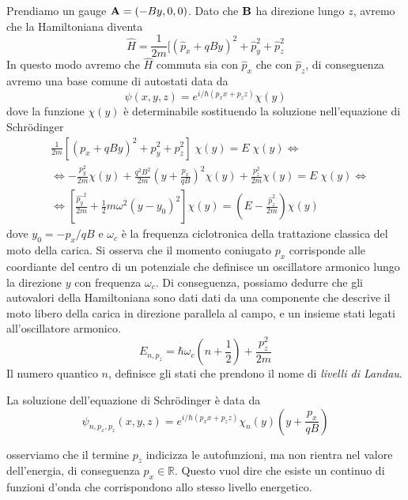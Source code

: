 Prendiamo un gauge $\bold{A} = (-By,0,0)$. Dato che $\bold{B}$ ha direzione lungo $z$, avremo che la Hamiltoniana diventa 
\begin{equation}
	\hat{H} = \frac{1}{2m}[(\hat{p}_x+qBy)^2 + \hat{p}^2_y + \hat{p}^2_z
\end{equation}
 In questo modo avremo che $\hat{H}$ commuta sia con $\hat{p}_x$ che con $\hat{p}_z$, di conseguenza avremo una base comune di autostati data da 
 \begin{equation*}
 	\psi(x,y,z) = e^{i/\hbar(p_x x+p_z z) }\chi(y)
 \end{equation*}
dove la funzione $\chi(y)$ \`e determinabile sostituendo la soluzione nell'equazione di Schr\"odinger 
\begin{align*}
	& \frac{1}{2m} [ (p_x +qBy)^2 + p_y^2 + p_z^2]\; \chi(y) = E \; \chi(y) \iff\\[0.5cm] 
	& \iff -\frac{p^2_y}{2m}\chi(y) + \frac{q^2B^2}{2m} \left (y + \frac{p_x}{qB} \right)^2\chi(y) + \frac{p_z^2}{2m}\chi(y) = E \; \chi(y) \iff \\[0.5cm]
	& \iff \left[\frac{{\hat{p_y}}^2}{2 m}+\frac{1}{2} m \omega^2\left(y-y_0\right)^2\right] \chi(y)=\left(E-\frac{\hat{p}_z^2}{2 m}\right) \chi(y) 
\end{align*}
dove $y_0 = -p_x / qB$ e $\omega_c$ \`e la frequenza ciclotronica della trattazione classica del moto della carica. Si osserva che il momento coniugato $p_x$ corrisponde alle coordiante del centro di un potenziale che definisce un oscillatore armonico lungo la direzione $y$ con frequenza $\omega_c$.  Di conseguenza, possiamo dedurre che gli autovalori della Hamiltoniana sono dati dati da una componente che descrive il moto libero della carica in direzione parallela al campo, e un insieme stati legati all'oscillatore armonico.
\begin{equation}
	E_{n,p_z} = \hbar \omega_c \left( n + \frac{1}{2} \right) + \frac{p_z^2}{2m}
\end{equation}
Il numero quantico $n$, definisce gli stati che prendono il nome di \textit{livelli di Landau}.

La soluzione dell'equazione di Schr\"odinger \`e data da
\begin{equation}
	 	\psi_{n,p_x,p_z}(x,y,z) = e^{i/\hbar(p_x x+p_z z) }\chi_n(y)\left(y + \frac{p_x}{qB} \right)
\end{equation}

osserviamo che il termine $p_z$ indicizza le autofunzioni, ma non rientra nel valore dell'energia, di conseguenza $p_x \in \mathbb{R}$. Questo vuol dire che esiste un continuo di funzioni d'onda che corrispondono allo stesso livello energetico.

